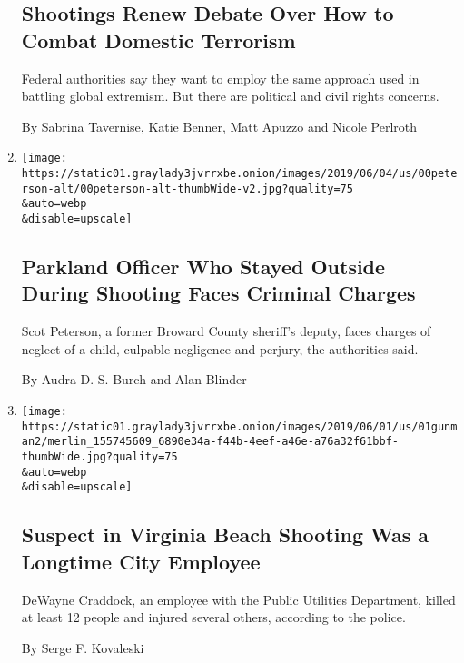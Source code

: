 \begin{enumerate}
{  \subsection{Shootings Renew Debate Over How to Combat Domestic
  Terrorism}\label{shootings-renew-debate-over-how-to-combat-domestic-terrorism}}

  Federal authorities say they want to employ the same approach used in
  battling global extremism. But there are political and civil rights
  concerns.

  By Sabrina Tavernise, Katie Benner, Matt Apuzzo and Nicole Perlroth
\item
  \href{/2019/06/04/us/parkland-scot-peterson.html}{}

  \texttt{[image: https://static01.graylady3jvrrxbe.onion/images/2019/06/04/us/00peterson-alt/00peterson-alt-thumbWide-v2.jpg?quality=75\\\&auto=webp\\\&disable=upscale]}

  \hypertarget{parkland-officer-who-stayed-outside-during-shooting-faces-criminal-charges}{%
  \subsection{Parkland Officer Who Stayed Outside During Shooting Faces
  Criminal
  Charges}\label{parkland-officer-who-stayed-outside-during-shooting-faces-criminal-charges}}

  Scot Peterson, a former Broward County sheriff's deputy, faces charges
  of neglect of a child, culpable negligence and perjury, the
  authorities said.

  By Audra D. S. Burch and Alan Blinder
\item
  \href{/2019/06/01/us/dewayne-craddock-virginia.html}{}

  \texttt{[image: https://static01.graylady3jvrrxbe.onion/images/2019/06/01/us/01gunman2/merlin\_155745609\_6890e34a-f44b-4eef-a46e-a76a32f61bbf-thumbWide.jpg?quality=75\\\&auto=webp\\\&disable=upscale]}

  \hypertarget{suspect-in-virginia-beach-shooting-was-a-longtime-city-employee}{%
  \subsection{Suspect in Virginia Beach Shooting Was a Longtime City
  Employee}\label{suspect-in-virginia-beach-shooting-was-a-longtime-city-employee}}

  DeWayne Craddock, an employee with the Public Utilities Department,
  killed at least 12 people and injured several others, according to the
  police.

  By Serge F. Kovaleski
\end{enumerate}

